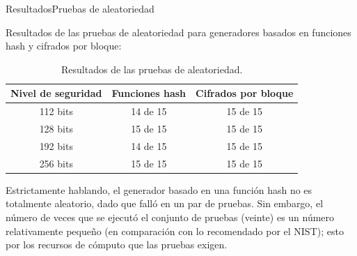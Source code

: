 \begin{frame}{Resultados}{Pruebas de aleatoriedad}

  Resultados de las pruebas de aleatoriedad para generadores basados en
  funciones hash y cifrados por bloque:

    \begin{table}
      \begin{center}
        \begin{tabular}{|c|c|c|}
          \hline
          Nivel de seguridad &
          Funciones hash &
          Cifrados por bloque \\\hline
          112 bits & 14 de 15 & 15 de 15 \\\hline
          128 bits & 15 de 15 & 15 de 15 \\\hline
          192 bits & 14 de 15 & 15 de 15 \\\hline
          256 bits & 15 de 15 & 15 de 15 \\\hline
        \end{tabular}
        \caption{Resultados de las pruebas de aleatoriedad.}
      \end{center}
    \end{table}

  \note
  {
    Estrictamente hablando, el generador basado en una función hash no es
    totalmente aleatorio, dado que falló en un par de pruebas. Sin embargo,
    el número de veces que se ejecutó el conjunto de pruebas (veinte) es
    un número relativamente pequeño (en comparación con lo recomendado por
    el NIST); esto por los recursos de cómputo que las pruebas exigen.
  }

\end{frame}
